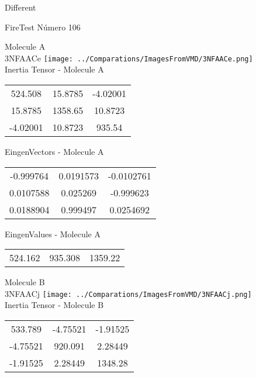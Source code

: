 \begin{center}
\vtab
\vtab
\textcolor{NavyBlue}{\Large Different}
\end{center}

 \newpage

\vtab[-2cm]
\begin{center}
{\large FireTest \tab Número 106}
\end{center}
\begin{multicols}{2}
\begin{center}

Molecule A \\ 
3NFAACe
\texttt{[image: ../Comparations/ImagesFromVMD/3NFAACe.png]}
\\
Inertia Tensor - Molecule A \\
\vtab

\begin{tabular}{|c c c|}
524.508	 & 	15.8785	 & 	-4.02001	 \\
15.8785	 & 	1358.65	 & 	10.8723	 \\
-4.02001	 & 	10.8723	 & 	935.54
\end{tabular}

\vtab
 EingenVectors - Molecule A     \\
\vtab
\begin{tabular}{|c c c|}
-0.999764	 & 	0.0191573	 & 	-0.0102761	 \\
0.0107588	 & 	0.025269	 & 	-0.999623	 \\
0.0188904	 & 	0.999497	 & 	0.0254692
\end{tabular}

\vtab
 EingenValues - Molecule A     \\
\vtab
\begin{tabular}{|c c c|}
524.162	 & 	935.308	 & 	1359.22	 \\
\end{tabular}
\columnbreak

Molecule B \\ 
3NFAACj
\texttt{[image: ../Comparations/ImagesFromVMD/3NFAACj.png]}
\\
Inertia Tensor - Molecule B \\
\vtab

\begin{tabular}{|c c c|}
533.789	 & 	-4.75521	 & 	-1.91525	 \\
-4.75521	 & 	920.091	 & 	2.28449	 \\
-1.91525	 & 	2.28449	 & 	1348.28
\end{tabular}


\end{center}
\end{multicols}
